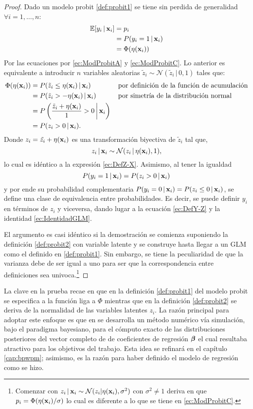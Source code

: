 \documentclass[../Main/Main.tex]{subfiles}
\begin{document}
\begin{proof} Dado un modelo probit \ref{def:probit1} se tiene sin perdida de generalidad $\forall i = 1,\ldots,n$:
\begin{align*}
	\mathbb{E}[y_i\,|\,\mathbf{x}_i] &= p_i  \\
				&= P(y_i = 1\,|\,\mathbf{x}_i) \\
				&= \Phi(\eta(\mathbf{x}_i))
\end{align*}
Por las ecuaciones por \eqref{ec:ModProbitA} y \eqref{ec:ModProbitC}. Lo anterior es equivalente a introducir $n$ variables aleatorias $\tilde{z}_i \sim \mathcal{N}(\tilde{z}_i\,|\,0,1)$ tales que:
\begin{align*}
	\Phi(\eta(\mathbf{x}_i)) 	&= P(\tilde{z}_i \leq \eta(\mathbf{x}_i)\,|\,\mathbf{x}_i)
					\qquad\qquad \text{por definición de la función de acumulación}\\
			      	&= P(\tilde{z}_i > - \eta(\mathbf{x}_i)\,|\,\mathbf{x}_i) \qquad\:\quad \text{por simetría de la distribución normal}\\
			      	&= P\left(\dfrac{\tilde{z}_i + \eta(\mathbf{x}_i)}{1} > 0\,\bigg|\,\mathbf{x}_i\right)\\
			      	&= P(z_i > 0\,|\,\mathbf{x}_i).
\end{align*}
Donde $z_i = \tilde{z_i} + \eta(\mathbf{x}_i)$ es una transformación biyectiva de $\tilde{z}_i$ tal que,
$$z_i\,|\,\mathbf{x}_i \sim \mathcal{N}(z_i\,|\,\eta(\mathbf{x}_i),1),$$ 
lo cual es idéntico a la expresión \eqref{ec:DefZ-X}. Asimismo, al tener la igualdad $$P(y_i = 1\,|\,\mathbf{x}_i) = P(z_i > 0\,|\,\mathbf{x}_i)$$ y por ende su probabilidad complementaria $P(y_i = 0\,|\,\mathbf{x}_i) = P(z_i \leq 0\,|\,\mathbf{x}_i)$, se define una clase de equivalencia entre probabilidades. Es decir, se puede definir $y_i$ en términos de $z_i$ y viceversa, dando lugar a la ecuación \eqref{ec:DefY-Z} y la identidad \eqref{ec:IdentidadGLM}. 

El argumento es casi idéntico si la demostración se comienza suponiendo la definición \ref{def:probit2} con variable latente y se construye hasta llegar a un GLM como el definido en \ref{def:probit1}. Sin embargo, se tiene la peculiaridad de que la varianza debe de ser igual a uno para ser que la correspondencia entre definiciones sea univoca.\footnote{Comenzar con $z_i\,|\,\mathbf{x}_i \sim \mathcal{N}(z_i|\eta(\mathbf{x}_i),\sigma^2)$ con $\sigma^2\neq 1$ deriva en que $p_i = \Phi(\eta(\mathbf{x}_i)/\sigma)$ lo cual es diferente a lo que se tiene en \eqref{ec:ModProbitC}.}
\end{proof}

La clave en la prueba recae en que en la definición \ref{def:probit1} del modelo probit se especifica a la función liga a $\Phi$ mientras que en la definición \ref{def:probit2} se deriva de la normalidad de las variables latentes $z_i$. La razón principal para adoptar este enfoque es que en \citet{albert1993bayesian} se desarrolla un método numérico vía simulación, bajo el paradigma bayesiano, para el cómputo exacto de las distribuciones posteriores del vector completo de de coeficientes de regresión $\bm{\beta}$ el cual resultaba atractivo para los objetivos del trabajo. Esta idea se refinará en el capítulo \ref{cap:bpwpm}; asimismo, es la razón para haber definido el modelo de regresión como se hizo.
\end{document}
